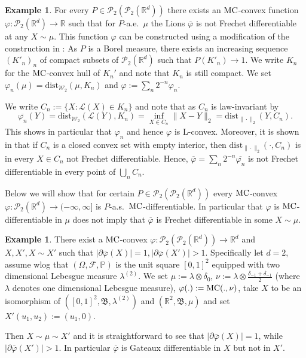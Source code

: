 \documentclass[a4paper]{amsart}
\numberwithin{theorem}{section}
\theoremstyle{definition}
\newtheorem{example}[theorem]{Example}
\newcommand{\R}{\mathbb{R}}
\newcommand{\F}{\mathcal{F}}
\newcommand{\law}{\mathcal{L}}
\newcommand{\W}{\mathcal{W}}
\newcommand{\Pc}{\mathcal P}
\renewcommand{\P}{\mathbb{P}}
\renewcommand{\phi}{\varphi}
\newcommand{\mc}{\textup{MC}}
\newcommand{\MC}{\textup{MC}}
\begin{document}
\begin{example}\label{ex:nonFrechet} 
For every $P \in \Pc_2(\Pc_2(\R^d))$ there exists an $\mc$-convex function $\phi : \Pc_2(\R^d) \to \R$ such that for $P$-a.e.\ $\mu$ the Lions $\overline{\phi}$ is not Frechet differentiable at any $X \sim \mu$. This function $\phi$ can be constructed using a modification of the construction in \cite[Example~4.6.10]{BoVa10}: As $P$ is a Borel measure, there exists an increasing sequence $(K'_n)_n$ of compact subsets of $\Pc_2(\R^d)$ such that $P(K'_n) \to 1$. We write $K_n$ for the $\mc$-convex hull of $K_n'$ and note that $K_n$ is still compact. We set $\phi_n(\mu) = \textrm{dist}_{\W_2}(\mu,K_n)$ and $\phi := \sum_n 2^{-n} \phi_n$.

We write $C_n := \{X : \law(X) \in K_n \}$ and note that as $C_n$ is law-invariant by  
\[
\overline{\phi_n}(Y) =  \textrm{dist}_{\W_2}(\law(Y),K_n) = \inf_{X \in C_n } \| X- Y \|_2 = \textrm{dist}_{\|\cdot\|_2}(Y,C_n).
\]
This shows in particular that $\phi_n$ and hence $\phi$ is L-convex. Moreover, it is shown in \cite[Exercise~4.2.6]{BoVa10} that if $C_n$ is a closed convex set with empty interior, then $\textrm{dist}_{\|\cdot\|_2}(\cdot,C_n)$ is in every $X \in C_n$ not Frechet differentiable. Hence, $\overline{\phi} = \sum_n 2^{-n}  \overline{\phi_n}$ is not Frechet differentiable in every point of $\bigcup_n C_n$. 


Below we will show that for certain  $P \in \Pc_2(\Pc_2(\R^d))$ every  $\mc$-convex $\phi : \Pc_2(\R^d) \to (-\infty, \infty]$ is $P$-a.s.\ $\mc$-differentiable. In particular  that $\phi$ is $\mc$-differentiable in $\mu$ does not imply that $\overline\phi$ is Frechet differentiable in some $X\sim \mu$.
\end{example}

\begin{example}
There exist a $\mc$-convex $\phi:\Pc_2(\Pc_2(\R^d)) \to \R^d$ and $X, X', X\sim X'$ such that $|\partial \overline\phi(X)| = 1, |\partial \overline\phi(X')| > 1 $. Specifically let $d=2$, assume wlog that $(\Omega, \F, \P)$ is the unit square $[0,1]^2$ equipped with two dimensional  Lebesgue measure $\lambda^{(2)}$. We set $\mu:=\lambda\otimes \delta_0$, $\nu:= \lambda\otimes \tfrac{\delta_{-1} + \delta_{-1}}{2}$ (where $\lambda$ denotes one dimensional Lebesgue measure), $\phi(.):= \MC(.,\nu)$, take $X$ to be an isomorphism of $([0,1]^2, \mathfrak B, \lambda^{(2)})$ and $(\R^2, \mathfrak B, \mu )$ and set $X'(u_1, u_2):= (u_1,0)$. 

Then $X\sim \mu\sim X'$ and it is straightforward to see that $|\partial \overline\phi(X)| = 1$, while $|\partial \overline\phi(X')| > 1$.  In particular $\overline\phi$ is Gateaux differentiable in $X$ but not in $X'$. 
\end{example}
\end{document}
